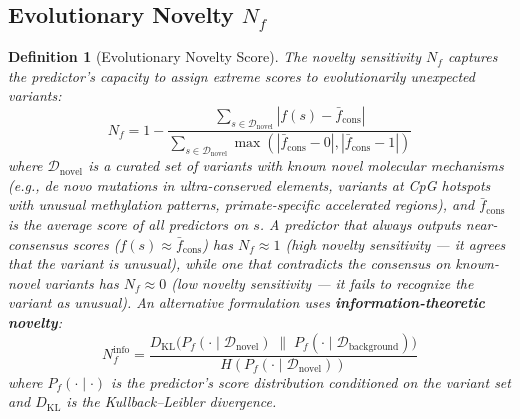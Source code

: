 \documentclass[11pt,a4paper]{article}
\newtheorem{definition}[theorem]{Definition}
\theoremstyle{definition}
\newcommand{\calD}{\mathcal{D}}
\begin{document}
\subsection{Evolutionary Novelty $N_f$}
\begin{definition}[Evolutionary Novelty Score]
The novelty sensitivity $N_f$ captures the predictor's capacity to assign extreme scores to evolutionarily unexpected variants:
\begin{equation}
    N_f = 1 - \frac{\sum_{s \in \calD_{\text{novel}}} |f(s) - \bar{f}_{\text{cons}}|}{\sum_{s \in \calD_{\text{novel}}} \max(|\bar{f}_{\text{cons}} - 0|, |\bar{f}_{\text{cons}} - 1|)}
\end{equation}
where $\calD_{\text{novel}}$ is a curated set of variants with known novel molecular mechanisms (e.g., de novo mutations in ultra-conserved elements, variants at CpG hotspots with unusual methylation patterns, primate-specific accelerated regions), and $\bar{f}_{\text{cons}}$ is the average score of all predictors on $s$.
A predictor that always outputs near-consensus scores ($f(s) \approx \bar{f}_{\text{cons}}$) has $N_f \approx 1$ (high novelty sensitivity — it agrees that the variant is unusual), while one that contradicts the consensus on known-novel variants has $N_f \approx 0$ (low novelty sensitivity — it fails to recognize the variant as unusual).
An alternative formulation uses \textbf{information-theoretic novelty}:
\begin{equation}
    N_f^{\text{info}} = \frac{D_{\text{KL}}\big(P_f(\cdot \mid \calD_{\text{novel}}) \;\|\; P_f(\cdot \mid \calD_{\text{background}})\big)}{H(P_f(\cdot \mid \calD_{\text{novel}}))}
\end{equation}
where $P_f(\cdot \mid \cdot)$ is the predictor's score distribution conditioned on the variant set and $D_{\text{KL}}$ is the Kullback--Leibler divergence.
\end{definition}
\end{document}
